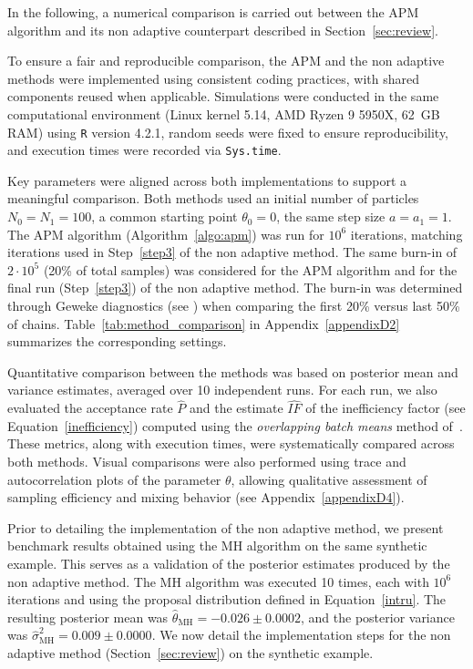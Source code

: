 \documentclass[pdflatex,sn-mathphys-num]{sn-jnl}
\theoremstyle{thmstyleone}
\theoremstyle{thmstyletwo}
\theoremstyle{thmstylethree}
\begin{document}
In the following, a numerical comparison is carried out between the APM algorithm and its non adaptive counterpart described in Section~\ref{sec:review}.

To ensure a fair and reproducible comparison, the APM and the non adaptive methods were implemented using consistent coding practices, with shared components reused when applicable. Simulations were conducted in the same computational environment (Linux kernel 5.14, AMD Ryzen 9 5950X, 62~GB RAM) using \texttt{R} version 4.2.1, random seeds were fixed to ensure reproducibility, and execution times were recorded via \texttt{Sys.time}.

Key parameters were aligned across both implementations to support a meaningful comparison. Both methods used an initial number of particles \( N_0 = N_1 = 100 \), a common starting point \( \theta_0 = 0 \), the same step size \( a = a_1 = 1 \). The APM algorithm (Algorithm~\ref{algo:apm}) was run for \(10^6\) iterations, matching iterations used in Step~\ref{step3} of the non adaptive method. The same burn-in of $2 \cdot 10^5$ (20\% of total samples) was considered for the APM algorithm and for the final run (Step~\ref{step3}) of the non adaptive method. The burn-in was determined through Geweke diagnostics (see \cite{geweke_1995})  when comparing the first 20\% versus last 50\% of chains. Table~\ref{tab:method_comparison} in Appendix~\ref{appendixD2} summarizes the corresponding settings.

Quantitative comparison between the methods was based on posterior mean and variance estimates, averaged over 10 independent runs. For each run, we also evaluated the acceptance rate \( \widehat{P} \) and the estimate \( \widehat{IF} \) of the inefficiency factor (see Equation~\eqref{inefficiency}) computed using the \textit{overlapping batch means} method of~\cite{flegal_batch_2010}. These metrics, along with execution times, were systematically compared across both methods. Visual comparisons were also performed using trace and autocorrelation plots of the parameter \( \theta \), allowing qualitative assessment of sampling efficiency and mixing behavior (see Appendix~\ref{appendixD4}).

Prior to detailing the implementation of the non adaptive method, we present benchmark results obtained using the MH algorithm on the same synthetic example. This serves as a validation of the posterior estimates produced by the non adaptive method. The MH algorithm was executed 10 times, each with \(10^6\) iterations and using the proposal distribution defined in Equation~\eqref{intru}. The resulting posterior mean was \( \hat\theta_\text{MH} = -0.026 \pm 0.0002 \), and the posterior variance was \( \hat\sigma^2_\text{MH} = 0.009 \pm 0.0000 \). We now detail the implementation steps for the non adaptive method (Section~\ref{sec:review}) on the synthetic example.
\end{document}

